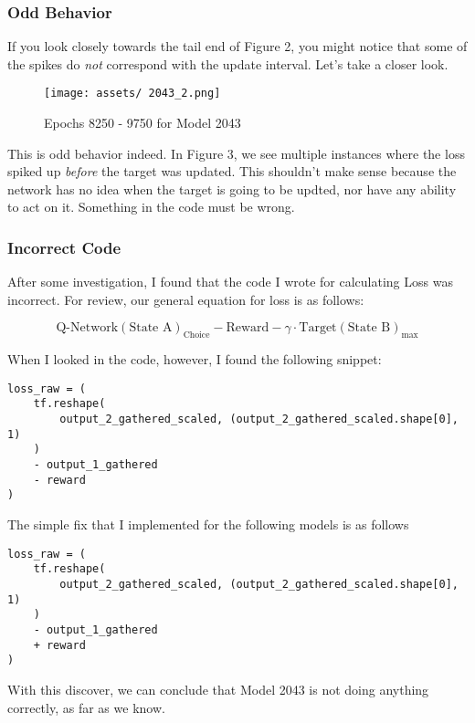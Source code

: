 \documentclass[12pt]{article}
\begin{document}
\newpage

\subsubsection{Odd Behavior}

If you look closely towards the tail end of Figure 2, you might notice that some of the spikes do \textit{not} correspond with the update interval. Let's take a closer look.


\begin{figure}[h]
	\centering
	\caption{Epochs 8250 - 9750 for Model 2043}
	\texttt{[image: assets/ 2043\_2.png]}
\end{figure}

This is odd behavior indeed. In Figure 3, we see multiple instances where the loss spiked up \textit{before} the target was updated. This shouldn't make sense because the network has no idea when the target is going to be updted, nor have any ability to act on it. Something in the code must be wrong.

\newpage

\subsubsection{Incorrect Code}

After some investigation, I found that the code I wrote for calculating Loss was incorrect. For review, our general equation for loss is as follows:

$$\text{Q-Network}(\text{State A})_{\text{Choice}} - \text{Reward} - \gamma \cdot \text{Target}(\text{State B})_{\text{max}}$$

When I looked in the code, however, I found the following snippet:


\begin{verbatim}
loss_raw = (
	tf.reshape(
		output_2_gathered_scaled, (output_2_gathered_scaled.shape[0], 1)
	)
	- output_1_gathered
	- reward
)
\end{verbatim}

The simple fix that I implemented for the following models is as follows

\begin{verbatim}
loss_raw = (
	tf.reshape(
		output_2_gathered_scaled, (output_2_gathered_scaled.shape[0], 1)
	)
	- output_1_gathered
	+ reward
)
\end{verbatim}


With this discover, we can conclude that Model 2043 is not doing anything correctly, as far as we know.
\end{document}

